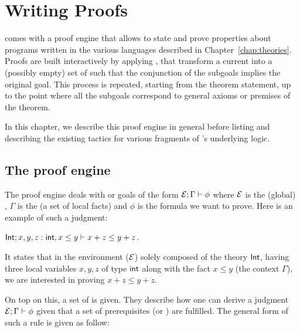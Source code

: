 

\chapter{Writing Proofs\label{chap:tactics}}

\EasyCrypt comes with a proof engine that allows to state and prove properties
about programs written in the various languages described in
Chapter~\ref{chap:theories}.
%
Proofs are built interactively by applying , that transform a
current  into a (possibly empty) set of
 such that the conjunction of the subgoals implies the
original goal.
%
This process is repeated, starting from the theorem statement, up to the point
where all the subgoals correspond to general axioms or premises of the theorem.

In this chapter, we describe this proof engine in general before listing and
describing the existing tactics for various fragments of \EasyCrypt's
underlying logic.

\section{The proof engine}

The proof engine deals with  or goals of the form
$\mathcal{E}; \Gamma \vdash \phi$ where $\mathcal{E}$ is the (global) ,
$\Gamma$ is the  (a set of local facts) and $\phi$ is the
formula we want to prove. Here is an example of such a judgment:

\begin{center}
$\mathsf{Int}; x, y , z: \mathsf{int}, x \le y \vdash x + z \le y + z$.
\end{center}

It states that in the environment ($\mathcal{E}$) solely composed of the
theory $\mathsf{Int}$, having three local variables $x, y, z$ of type $\mathsf{int}$ along
with the fact $x \le y$ (the context $\Gamma$), we are interested
in proving $x + z \le y + z$.

\medskip

On top on this, a set of  is given. They
describe how one can derive a judgment $\mathcal{E}; \Gamma \vdash \phi$ given
that a set of prerequisites (or ) are fulfilled. The
general form of such a rule is given as follow:

